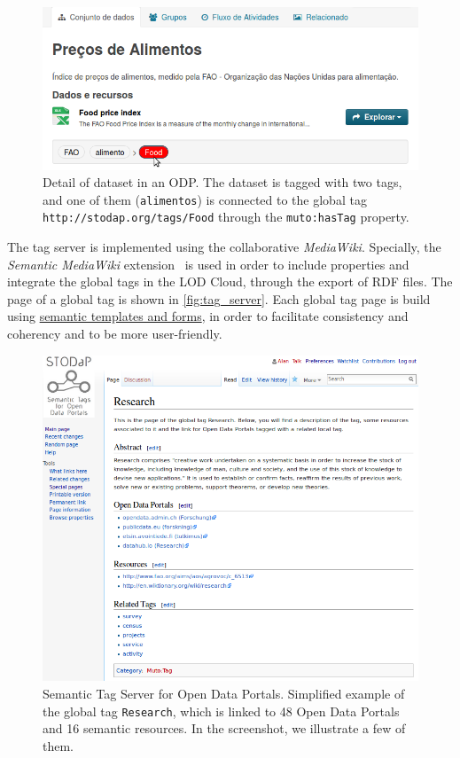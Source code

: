 \documentclass[conference]{IEEEtran}
\begin{document}
\begin{figure}[ht]
\begin{center}
\includegraphics[width=\columnwidth]{images/local_link.png}
\caption{Detail of dataset in an ODP. The dataset is tagged with two tags, and one of them (\texttt{alimentos}) is connected to the global tag \texttt{http://stodap.org/tags/Food} through the \texttt{muto:hasTag} property.}
\label{fig:local_link}
\end{center}
\end{figure}

The tag server is implemented using the collaborative \emph{MediaWiki}. 
Specially, the \emph{Semantic MediaWiki} extension~\cite{Kroetzsch2007} is used in order to include properties and integrate the global tags in the LOD Cloud, through the export of RDF files.
The page of a global tag is shown in \autoref{fig:tag_server}.
Each global tag page is build using \href{https://www.mediawiki.org/wiki/Extension:Semantic_Forms}{semantic templates and forms}, in order to facilitate consistency and coherency and to be more user-friendly.

\begin{figure}[ht]
\begin{center}
\includegraphics[width=\columnwidth]{images/tag_server.png}
\caption{Semantic Tag Server for Open Data Portals. Simplified example of the global tag \texttt{Research}, which is linked to 48 Open Data Portals and 16 semantic resources. In the screenshot, we illustrate a few of them.}
\label{fig:tag_server}
\end{center}
\end{figure}
\end{document}
